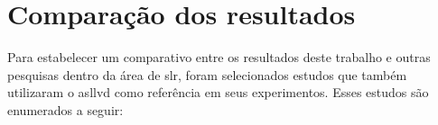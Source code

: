 \section{Comparação dos resultados}
\label{sec:comparacao-resultados}

Para estabelecer um comparativo entre os resultados deste trabalho e outras pesquisas dentro da área de \acrfull{slr}, foram selecionados estudos que também utilizaram o \acrshort{asllvd} como referência em seus experimentos.
Esses estudos são enumerados a seguir:



